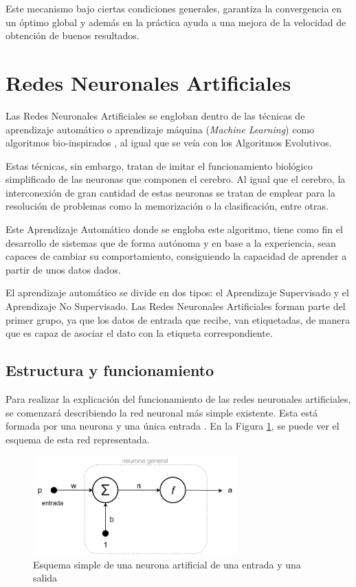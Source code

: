 Este mecanismo bajo ciertas condiciones generales, garantiza la convergencia en un óptimo global y además en la práctica ayuda a una mejora de la velocidad de obtención de buenos resultados.



\section{Redes Neuronales Artificiales}

Las Redes Neuronales Artificiales se engloban dentro de las técnicas de aprendizaje automático o aprendizaje máquina (\textit{Machine Learning}) como algoritmos bio-inspirados \cite{10.5555/523781}, al igual que se veía con los Algoritmos Evolutivos.

Estas técnicas, sin embargo, tratan de imitar el funcionamiento biológico simplificado de las neuronas que componen el cerebro. Al igual que el cerebro, la interconexión de gran cantidad de estas neuronas se tratan de emplear para la resolución de problemas como la memorización o la clasificación, entre otras.

Este Aprendizaje Automático donde se engloba este algoritmo, tiene como fin el desarrollo de sistemas que de forma autónoma y en base a la experiencia, sean capaces de cambiar su comportamiento, consiguiendo la capacidad de aprender a partir de unos datos dados. 

El aprendizaje automático se divide en dos tipos: el Aprendizaje Supervisado y el Aprendizaje No Supervisado. Las Redes Neuronales Artificiales forman parte del primer grupo, ya que los datos de entrada que recibe, van etiquetadas, de manera que es capaz de asociar el dato con la etiqueta correspondiente.

\subsection{Estructura y funcionamiento}

Para realizar la explicación del funcionamiento de las redes neuronales artificiales, se comenzará describiendo la red neuronal más simple existente. Esta está formada por una neurona y una única entrada \cite{10.5555/523781}. En la Figura \ref{fig:neurona_simple}, se puede ver el esquema de esta red representada.

\begin{figure}[h]
    \centering
    \includegraphics[width=0.7\textwidth]{figuras/desarrollo teorico/neurona.pdf}
    \caption{Esquema simple de una neurona artificial de una entrada y una salida}
    \label{fig:neurona_simple}
\end{figure}


